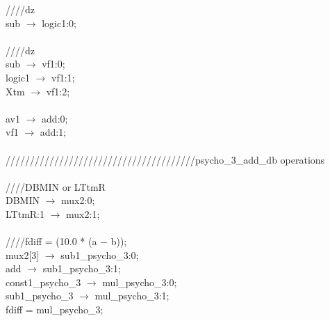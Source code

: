    \hspace*{2em}////dz \\
   \hspace*{2em}sub $\rightarrow$ logic1:0; \\
   \\
   \hspace*{2em}////dz \\
   \hspace*{2em}sub $\rightarrow$ vf1:0; \\
   \hspace*{2em}logic1 $\rightarrow$ vf1:1; \\
   \hspace*{2em}Xtm $\rightarrow$ vf1:2; \\
   \\
   \hspace*{2em}av1 $\rightarrow$ add:0; \\
   \hspace*{2em}vf1 $\rightarrow$ add:1; \\
   \\
   \hspace*{2em}///////////////////////////////////////psycho\_3\_add\_db operations \\
   \\
   \hspace*{2em}////DBMIN or LTtmR \\
   \hspace*{2em}DBMIN $\rightarrow$ mux2:0; \\
   \hspace*{2em}LTtmR:1 $\rightarrow$ mux2:1; \\
   \\
   \hspace*{2em}////fdiff = (10.0 * (a $-$ b)); \\
   \hspace*{2em}mux2[3] $\rightarrow$ sub1\_psycho\_3:0; \\
   \hspace*{2em}add $\rightarrow$ sub1\_psycho\_3:1; \\
   \hspace*{2em}const1\_psycho\_3 $\rightarrow$ mul\_psycho\_3:0; \\
   \hspace*{2em}sub1\_psycho\_3 $\rightarrow$ mul\_psycho\_3:1; \\
   \hspace*{2em}fdiff = mul\_psycho\_3; \\
   \\
